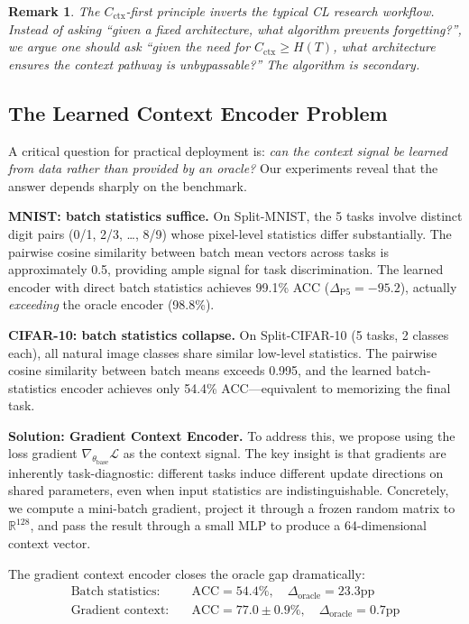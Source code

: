 \documentclass{article}
\newtheorem{remark}{Remark}
\begin{document}
\begin{remark}
The $C_\mathrm{ctx}$-first principle inverts the typical CL research workflow. Instead of asking ``given a fixed architecture, what algorithm prevents forgetting?'', we argue one should ask ``given the need for $C_\mathrm{ctx} \geq H(T)$, what architecture ensures the context pathway is unbypassable?'' The algorithm is secondary.
\end{remark}

\subsection{The Learned Context Encoder Problem}
\label{sec:learned_encoder}

A critical question for practical deployment is: \emph{can the context signal be learned from data rather than provided by an oracle?} Our experiments reveal that the answer depends sharply on the benchmark.

\textbf{MNIST: batch statistics suffice.} On Split-MNIST, the 5 tasks involve distinct digit pairs (0/1, 2/3, \ldots, 8/9) whose pixel-level statistics differ substantially. The pairwise cosine similarity between batch mean vectors across tasks is approximately 0.5, providing ample signal for task discrimination. The learned encoder with direct batch statistics achieves 99.1\% ACC ($\Delta_\mathrm{P5} = -95.2$), actually \emph{exceeding} the oracle encoder (98.8\%).

\textbf{CIFAR-10: batch statistics collapse.} On Split-CIFAR-10 (5 tasks, 2 classes each), all natural image classes share similar low-level statistics. The pairwise cosine similarity between batch means exceeds 0.995, and the learned batch-statistics encoder achieves only 54.4\% ACC---equivalent to memorizing the final task.

\textbf{Solution: Gradient Context Encoder.} To address this, we propose using the loss gradient $\nabla_{\theta_\mathrm{base}} \mathcal{L}$ as the context signal. The key insight is that gradients are inherently task-diagnostic: different tasks induce different update directions on shared parameters, even when input statistics are indistinguishable. Concretely, we compute a mini-batch gradient, project it through a frozen random matrix to $\mathbb{R}^{128}$, and pass the result through a small MLP to produce a 64-dimensional context vector.

The gradient context encoder closes the oracle gap dramatically:
\begin{align}
    \text{Batch statistics:} \quad & \text{ACC} = 54.4\%, \quad \Delta_\mathrm{oracle} = 23.3\text{pp} \\
    \text{Gradient context:} \quad & \text{ACC} = 77.0 \pm 0.9\%, \quad \Delta_\mathrm{oracle} = 0.7\text{pp}
\end{align}
\end{document}
